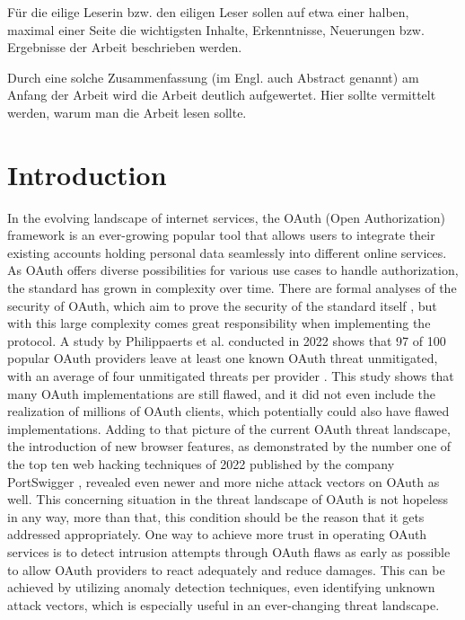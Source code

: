 \documentclass[
    fontsize=12pt,
    headings=small,
    parskip=half,           %
    bibliography=totoc,
    numbers=noenddot,       %
    open=any,               %
    ]{scrreprt}
\begin{document}
Für die eilige Leserin bzw. den eiligen Leser sollen auf etwa einer halben, maximal einer Seite die wichtigsten Inhalte, Erkenntnisse, Neuerungen bzw. Ergebnisse der Arbeit beschrieben werden.

Durch eine solche Zusammenfassung (im Engl. auch Abstract genannt) am Anfang der Arbeit wird die Arbeit deutlich aufgewertet. Hier sollte vermittelt werden, warum man die Arbeit lesen sollte.

\tableofcontents

\chapter{Introduction}
\label{chap:introduction}
In the evolving landscape of internet services, the OAuth (Open Authorization) framework is an ever-growing popular tool that allows users to integrate their existing accounts holding personal data seamlessly into different online services. As OAuth offers diverse possibilities for various use cases to handle authorization, the standard has grown in complexity over time. There are formal analyses of the security of OAuth, which aim to prove the security of the standard itself \cite{fett2016comprehensive}, but with this large complexity comes great responsibility when implementing the protocol. A study by Philippaerts et al. conducted in 2022 shows that 97 of 100 popular OAuth providers leave at least one known OAuth threat unmitigated, with an average of four unmitigated threats per provider \cite{philippaerts2022oauch}. This study shows that many OAuth implementations are still flawed, and it did not even include the realization of millions of OAuth clients, which potentially could also have flawed implementations. Adding to that picture of the current OAuth threat landscape, the introduction of new browser features, as demonstrated by the number one of the top ten web hacking techniques of 2022 published by the company PortSwigger \cite{kettle2022}, revealed even newer and more niche attack vectors on OAuth as well. This concerning situation in the threat landscape of OAuth is not hopeless in any way, more than that, this condition should be the reason that it gets addressed appropriately. One way to achieve more trust in operating OAuth services is to detect intrusion attempts through OAuth flaws as early as possible to allow OAuth providers to react adequately and reduce damages. This can be achieved by utilizing anomaly detection techniques, even identifying unknown attack vectors, which is especially useful in an ever-changing threat landscape.
\end{document}
